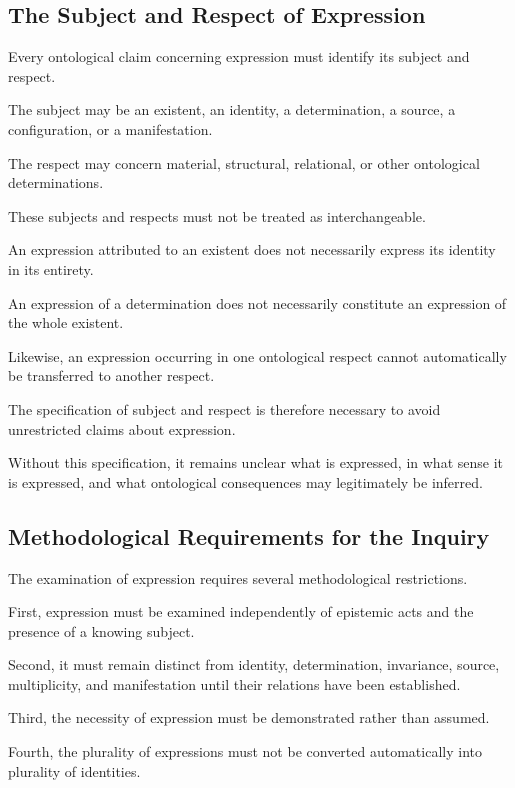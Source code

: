 \subsection{The Subject and Respect of Expression}

Every ontological claim concerning
expression must identify its subject
and respect.

The subject may be an existent,
an identity, a determination, a source,
a configuration, or a manifestation.

The respect may concern material,
structural, relational, or other
ontological determinations.

These subjects and respects must not
be treated as interchangeable.

An expression attributed to an existent
does not necessarily express its identity
in its entirety.

An expression of a determination does
not necessarily constitute an expression
of the whole existent.

Likewise, an expression occurring
in one ontological respect cannot
automatically be transferred to
another respect.

The specification of subject and respect
is therefore necessary to avoid
unrestricted claims about expression.

Without this specification, it remains
unclear what is expressed, in what sense
it is expressed, and what ontological
consequences may legitimately be inferred.

\subsection{Methodological Requirements for the Inquiry}

The examination of expression requires
several methodological restrictions.

First, expression must be examined
independently of epistemic acts and
the presence of a knowing subject.

Second, it must remain distinct from
identity, determination, invariance,
source, multiplicity, and manifestation
until their relations have been established.

Third, the necessity of expression
must be demonstrated rather than assumed.

Fourth, the plurality of expressions
must not be converted automatically
into plurality of identities.

